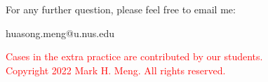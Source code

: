 	
\begin{frame}{}
	\centering  
	For any further question, please feel free to email me:\vspace{10pt}
	
	huasong.meng@u.nus.edu \vspace{20pt}
	
	\begin{tcolorbox}
		\begin{center}
			\textcolor{red}{Cases in the extra practice are contributed by our students.\\\vspace{5pt}Copyright 2022 Mark H. Meng. All rights reserved.}
		\end{center}
	\end{tcolorbox}
\end{frame}